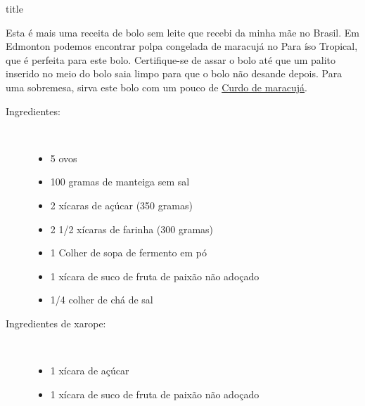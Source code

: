 \documentclass [11pt, letterpaper] {article}
\begin{document}
 {title}

Esta \'e mais uma receita de bolo sem leite que recebi da minha mãe no Brasil. Em Edmonton podemos encontrar polpa congelada de maracuj\'a no Para \'iso Tropical, que é perfeita para este bolo. Certifique-se de assar o bolo até que um palito inserido no meio do bolo saia limpo para que o bolo n\~ao desande depois. Para uma sobremesa, sirva este bolo com um pouco de \href {PassionFruitCurd.html} {Curdo de maracujá}.

\vspace {0.3in}
\begin {description}

\item [Ingredientes:] \ \\
\begin {itemize}
\item 5 ovos
\item 100 gramas de manteiga sem sal
\item 2 xícaras de açúcar (350 gramas)
\item 2 1/2 xícaras de farinha (300 gramas)
\item 1 Colher de sopa de fermento em pó
\item 1 xícara de suco de fruta de paixão não adoçado
\item 1/4 colher de chá de sal
\end {itemize}

\item [Ingredientes de xarope:] \ \\
\begin {itemize}
\item 1 xícara de açúcar
\item 1 xícara de suco de fruta de paixão não adoçado
\end {itemize}


\end{description}
\end{document}
